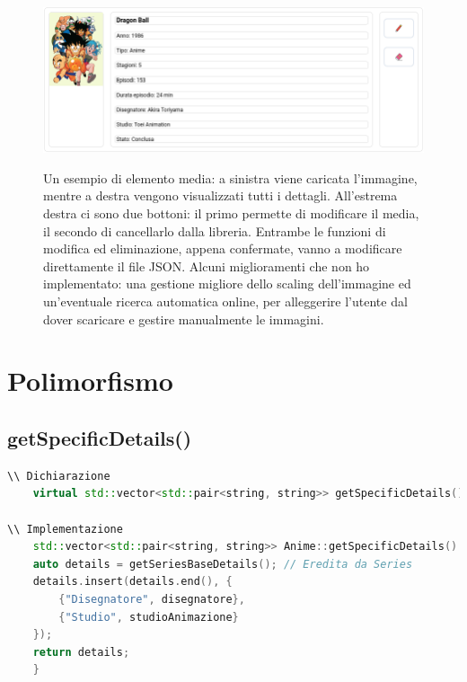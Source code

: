 \documentclass[a4paper,12pt]{article}
\begin{document}
\begin{figure}[ht!]
    \centering
    \begin{minipage}{0.4\textwidth}
        \includegraphics[width=\linewidth]{img/MediaItem.png}
    \end{minipage}\hfill
    \begin{minipage}{0.55\textwidth}
        \small
        Un esempio di elemento media: a sinistra viene caricata l'immagine, mentre a destra vengono visualizzati tutti i dettagli. All'estrema destra ci sono due bottoni: il primo permette di modificare il media, il secondo di cancellarlo dalla libreria. Entrambe le funzioni di modifica ed eliminazione, appena confermate, vanno a modificare direttamente il file JSON.\newline
        Alcuni miglioramenti che non ho implementato: una gestione migliore dello scaling dell'immagine ed un'eventuale ricerca automatica online, per alleggerire l'utente dal dover scaricare e gestire manualmente le immagini.
    \end{minipage}
\end{figure}

\clearpage

\section{Polimorfismo}

\subsection{getSpecificDetails()}

\begin{lstlisting}[language=cpp, style=cppstyle]
\\ Dichiarazione
    virtual std::vector<std::pair<string, string>> getSpecificDetails() const = 0;

\\ Implementazione
    std::vector<std::pair<string, string>> Anime::getSpecificDetails() const {
    auto details = getSeriesBaseDetails(); // Eredita da Series
    details.insert(details.end(), {
        {"Disegnatore", disegnatore},
        {"Studio", studioAnimazione}
    });
    return details;
    }
\end{lstlisting}
\end{document}
